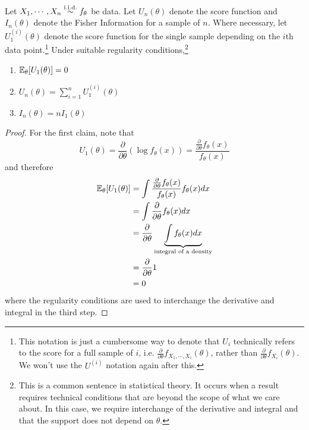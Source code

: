 \documentclass[../../../main.tex]{subfiles}
\begin{document}
\begin{proposition}\label{prop:score-fi-sample-size}
    Let $X_1,\cdots,X_n\overset{\mathrm{i.i.d.}}{\sim} f_\theta$ be data.
    Let $U_n(\theta)$ denote the score function and $I_n(\theta)$ denote the Fisher Information for a sample of $n$.
    Where necessary, let $U^{(i)}_1(\theta)$ denote the score function for the single sample depending on the $i$th data point.\footnote{This notation is just a cumbersome way to denote that $U_i$ technically refers to the score for a full sample of $i$, i.e. $\frac{\partial}{\partial \theta} f_{X_1,\cdots, X_i}(\theta)$, rather than $\frac{\partial}{\partial \theta} f_{X_i}(\theta)$. We won't use the $U^{(i)}$ notation again after this.}
    Under suitable regularity conditions,\footnote{This is a common sentence in statistical theory. It occurs when a result requires technical conditions that are beyond the scope of what we care about. In this case, we require interchange of the derivative and integral and that the support does not depend on $\theta$.}
    \begin{enumerate}
        \item $\mathbb{E}_\theta[U_1(\theta)]=0$
        \item $U_n(\theta)=\sum_{i=1}^n U^{(i)}_1(\theta)$
        \item $I_n(\theta)=nI_1(\theta)$
    \end{enumerate}
    \begin{proof}
        For the first claim, note that
        \begin{equation*}
            U_1(\theta)=\frac{\partial}{\partial \theta}(\log f_\theta(x))=\frac{\frac{\partial}{\partial \theta} f_\theta(x)}{f_\theta(x)}
        \end{equation*}
        and therefore
        \begin{align*}
            \mathbb{E}_\theta[U_1(\theta)]&=\int \frac{\frac{\partial}{\partial \theta} f_\theta(x)}{f_\theta(x)} f_\theta(x) dx\\
            &=\int \frac{\partial}{\partial \theta} f_\theta(x) dx\\
            &= \frac{\partial}{\partial \theta} \underbrace{\int f_\theta(x) dx}_{\textrm{integral of a density}}\\
            &= \frac{\partial}{\partial \theta} 1\\
            &= 0
        \end{align*}
        where the regularity conditions are used to interchange the derivative and integral in the third step.


\end{proof}
\end{proposition}
\end{document}
